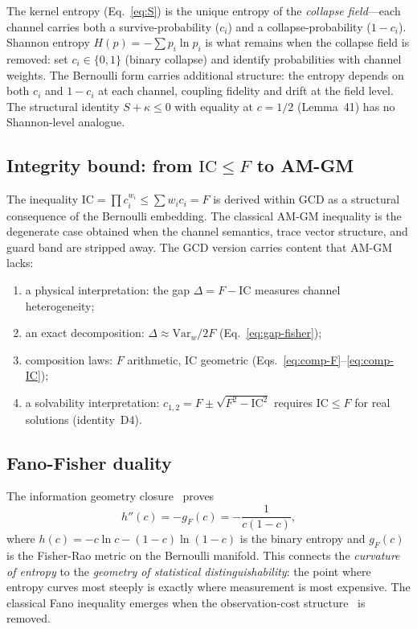 \documentclass[
  aps,
  prd,
  twocolumn,
  superscriptaddress,
  nofootinbib,
  floatfix
]{revtex4-2}
\newcommand{\beq}{\begin{equation}}
\newcommand{\eeq}{\end{equation}}
\newcommand{\IC}{\mathrm{IC}}
\newcommand{\gF}{g_{\!F}}
\begin{document}
The kernel entropy (Eq.~\ref{eq:S}) is the unique entropy of the
\emph{collapse field}---each channel carries both a
survive-probability ($c_i$) and a collapse-probability ($1 - c_i$).
Shannon entropy $H(p) = -\sum p_i \ln p_i$ is what remains when the
collapse field is removed: set $c_i \in \{0, 1\}$ (binary collapse)
and identify probabilities with channel weights.  The Bernoulli form
carries additional structure: the entropy depends on both $c_i$ and
$1 - c_i$ at each channel, coupling fidelity and drift at the field
level.  The structural identity $S + \kappa \leq 0$ with equality at
$c = 1/2$ (Lemma~41) has no Shannon-level analogue.

\subsection{Integrity bound: from \texorpdfstring{$\IC \leq F$}{IC <= F} to AM-GM}

The inequality $\IC = \prod c_i^{w_i} \leq \sum w_i c_i = F$ is
derived within GCD as a structural consequence of the Bernoulli
embedding.  The classical AM-GM inequality is the degenerate case
obtained when the channel semantics, trace vector structure, and
guard band are stripped away.  The GCD version carries content that
AM-GM lacks:
\begin{enumerate}[leftmargin=*,label=(\roman*)]
\item a physical interpretation: the gap $\Delta = F - \IC$ measures
  channel heterogeneity;
\item an exact decomposition: $\Delta \approx \mathrm{Var}_w/2F$
  (Eq.~\ref{eq:gap-fisher});
\item composition laws: $F$ arithmetic, $\IC$ geometric
  (Eqs.~\ref{eq:comp-F}--\ref{eq:comp-IC});
\item a solvability interpretation: $c_{1,2} = F \pm \sqrt{F^2 - \IC^2}$
  requires $\IC \leq F$ for real solutions (identity~D4).
\end{enumerate}

\subsection{Fano-Fisher duality}\label{sec:fanofisher}

The information geometry
closure~\cite{paulus2025physicscoherence} proves
\beq\label{eq:fano-fisher}
  h''(c) = -\gF(c) = -\frac{1}{c(1-c)},
\eeq
where $h(c) = -c\ln c - (1{-}c)\ln(1{-}c)$ is the binary entropy
and $\gF(c)$ is the Fisher-Rao metric on the Bernoulli manifold.
This connects the \emph{curvature of entropy} to the \emph{geometry
of statistical distinguishability}: the point where entropy curves
most steeply is exactly where measurement is most expensive.
The classical Fano inequality emerges when the observation-cost
structure~\cite{paulus2025seamreality} is removed.
\end{document}
